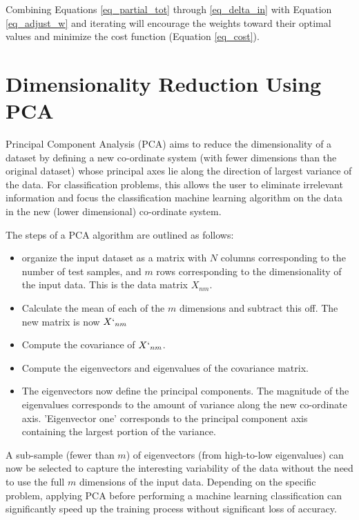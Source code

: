 \documentclass[10pt]{article}
\begin{document}
Combining Equations \ref{eq_partial_tot} through \ref{eq_delta_in} with Equation \ref{eq_adjust_w} and iterating will encourage the weights toward their optimal values and minimize the cost function (Equation \ref{eq_cost}).






\section{Dimensionality Reduction Using PCA}
Principal Component Analysis (PCA) aims to reduce the dimensionality of a dataset by defining a new co-ordinate system (with fewer dimensions than the original dataset) whose principal axes lie along the direction of largest variance of the data. For classification problems, this allows the user to eliminate irrelevant information and focus the classification machine learning algorithm on the data in the new (lower dimensional) co-ordinate system.

The steps of a PCA algorithm are outlined as follows:
\begin{itemize}
\item organize the input dataset as a matrix with $N$ columns corresponding to the number of test samples, and $m$ rows corresponding to the dimensionality of the input data. This is the data matrix $X_{nm}$.

\item Calculate the mean of each of the $m$ dimensions and subtract this off. The new matrix is now $X`_{nm}$

\item Compute the covariance of $X`_{nm}$.

\item Compute the eigenvectors and eigenvalues of the covariance matrix.

\item The eigenvectors now define the principal components. The magnitude of the eigenvalues corresponds to the amount of variance along the new co-ordinate axis. 'Eigenvector one' corresponds to the principal component axis containing the largest portion of the variance. 

\end{itemize}


A sub-sample (fewer than $m$) of eigenvectors (from high-to-low eigenvalues)  can now be selected to capture the interesting variability of the data without the need to use the full $m$ dimensions of the input data. Depending on the specific problem, applying PCA before performing a machine learning classification can significantly speed up the training process without significant loss of accuracy. 
\end{document}
